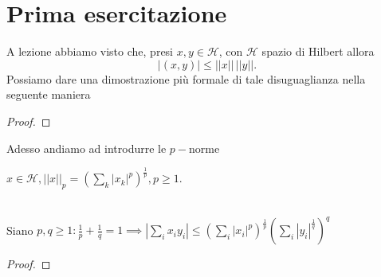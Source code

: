 \documentclass[12pt, twoside, italian, openany]{book}
\begin{document}
	\chapter{Prima esercitazione}

	A lezione abbiamo visto che, presi $x, y \in \mathcal{H}$, con $\mathcal{H}$ spazio di Hilbert allora
	$$
		|(x, y)| \leq ||x|| \, ||y||.
	$$
	Possiamo dare una dimostrazione più formale di tale disuguaglianza nella seguente maniera
	\begin{proof}
	
	\end{proof}
	Adesso andiamo ad introdurre le $p-$norme
	\begin{definition}
		$x \in \mathcal{H}, ||x||_p = (\sum_{k} |x_k|^p)^{\frac{1}{p}}, p \geq 1$.
	\end{definition}
	\begin{prop} \hspace{1cm} \\
		Siano $p, q \geq 1 : \frac{1}{p} + \frac{1}{q} = 1 \implies |\sum\limits_i x_i y_i| \leq (\sum\limits_i |x_i|^p)^{\frac{1}{p}} (\sum\limits_{i} |y_i|^{\frac{1}{q}})^q$
	\end{prop}
	\begin{proof}
		
	\end{proof}

\end{document}
